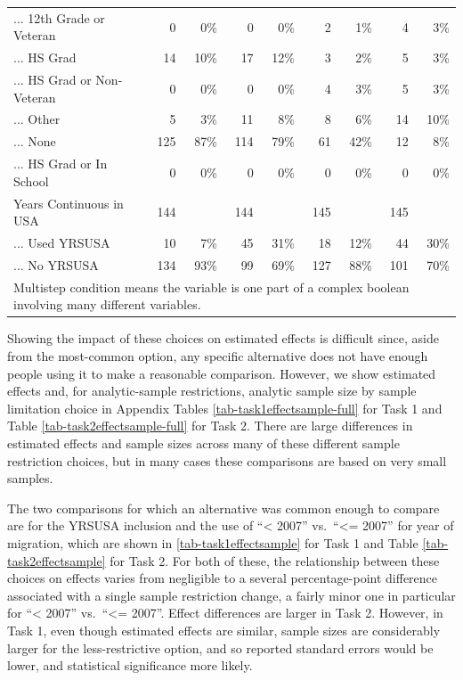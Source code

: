 \documentclass[
  letterpaper,
  DIV=11,
  numbers=noendperiod]{scrartcl}
\begin{document}
\begin{table}[!htbp]
{\begin{tabular}{lrrrrrrrr}
... 12th Grade or Veteran & 0 & 0\% & 0 & 0\% & 2 & 1\% & 4 & 3\% \\ 
... HS Grad & 14 & 10\% & 17 & 12\% & 3 & 2\% & 5 & 3\% \\ 
... HS Grad or Non-Veteran & 0 & 0\% & 0 & 0\% & 4 & 3\% & 5 & 3\% \\ 
... Other & 5 & 3\% & 11 & 8\% & 8 & 6\% & 14 & 10\% \\ 
... None & 125 & 87\% & 114 & 79\% & 61 & 42\% & 12 & 8\% \\ 
... HS Grad or In School & 0 & 0\% & 0 & 0\% & 0 & 0\% & 0 & 0\% \\ 
Years Continuous in USA & 144 &  & 144 &  & 145 &  & 145 &  \\ 
... Used YRSUSA & 10 & 7\% & 45 & 31\% & 18 & 12\% & 44 & 30\% \\ 
... No YRSUSA & 134 & 93\% & 99 & 69\% & 127 & 88\% & 101 & 70\%\\ 
\hline
\hline
\multicolumn{9}{l}{Multistep condition means the variable is one part of a complex boolean involving many different variables.}\\ 
\end{tabular}
}
\end{table}

Showing the impact of these choices on estimated effects is difficult
since, aside from the most-common option, any specific alternative does
not have enough people using it to make a reasonable comparison.
However, we show estimated effects and, for analytic-sample
restrictions, analytic sample size by sample limitation choice in
Appendix Tables \ref{tab-task1effectsample-full} for Task 1 and Table
\ref{tab-task2effectsample-full} for Task 2. There are large differences
in estimated effects and sample sizes across many of these different
sample restriction choices, but in many cases these comparisons are
based on very small samples.

The two comparisons for which an alternative was common enough to
compare are for the YRSUSA inclusion and the use of ``\textless{} 2007''
vs.~``\textless= 2007'' for year of migration, which are shown in
\ref{tab-task1effectsample} for Task 1 and Table
\ref{tab-task2effectsample} for Task 2. For both of these, the
relationship between these choices on effects varies from negligible to
a several percentage-point difference associated with a single sample
restriction change, a fairly minor one in particular for ``\textless{}
2007'' vs.~``\textless= 2007''. Effect differences are larger in Task 2.
However, in Task 1, even though estimated effects are similar, sample
sizes are considerably larger for the less-restrictive option, and so
reported standard errors would be lower, and statistical significance
more likely.
\end{document}
